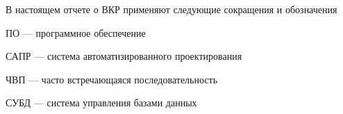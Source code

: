 
В настоящем отчете о ВКР применяют следующие сокращения и обозначения



\noindent ПО --- программное обеспечение

\noindent САПР --- система автоматизированного проектирования


\noindent ЧВП --- часто встречающаяся последовательность

\noindent СУБД --- система управления базами данных



